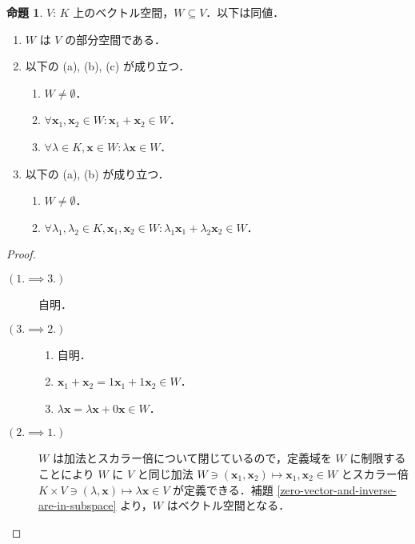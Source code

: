 \documentclass{jlreq}
\theoremstyle{definition}
\newtheorem{prop}[thm]{命題}
\begin{document}
      \begin{prop}
        $V$: $K$ 上のベクトル空間，$W \subseteq V$．以下は同値．
        \begin{enumerate}
          \item $W$ は $V$ の部分空間である．
          \item 以下の (a), (b), (c) が成り立つ．
            \begin{enumerate}
              \item $W \neq \emptyset$．
              \item $\forall \bm{x}_1,\bm{x}_2 \in W: \bm{x}_1+\bm{x}_2 \in W$．
              \item $\forall \lambda \in K, \bm{x} \in W: \lambda\bm{x} \in W$．
            \end{enumerate}
          \item 以下の (a), (b) が成り立つ．
            \begin{enumerate}
              \item $W \neq \emptyset$．
              \item $\forall \lambda_1,\lambda_2 \in K, \bm{x}_1,\bm{x}_2 \in W: \lambda_1\bm{x}_1+\lambda_2\bm{x}_2 \in W$．
            \end{enumerate}
        \end{enumerate}
      \end{prop}
      \begin{proof}
        \mbox{}
        \begin{description}
          \item [$(1. \implies 3.) \, $] 自明．
          \item [$(3. \implies 2.) \, $] \mbox{}\begin{enumerate}[label=\text{(\alph*) }] 
              \item 自明．
              \item $\bm{x}_1+\bm{x}_2=1\bm{x}_1+1\bm{x}_2 \in W$．
              \item $\lambda \bm{x} = \lambda\bm{x}+0\bm{x} \in W$．
          \end{enumerate}
          \item [$(2. \implies 1.) \, $]
            \mbox{}
            
            $W$ は加法とスカラー倍について閉じているので，定義域を $W$ に制限することにより $W$ に $V$ と同じ加法 $W \ni (\bm{x}_1,\bm{x}_2) \mapsto \bm{x}_1,\bm{x}_2 \in W$ とスカラー倍 $K \times V \ni (\lambda,\bm{x}) \mapsto \lambda\bm{x} \in V$ が定義できる．補題 \ref{zero-vector-and-inverse-are-in-subspace} より，$W$ はベクトル空間となる．
        \end{description}
      \end{proof}
\end{document}

